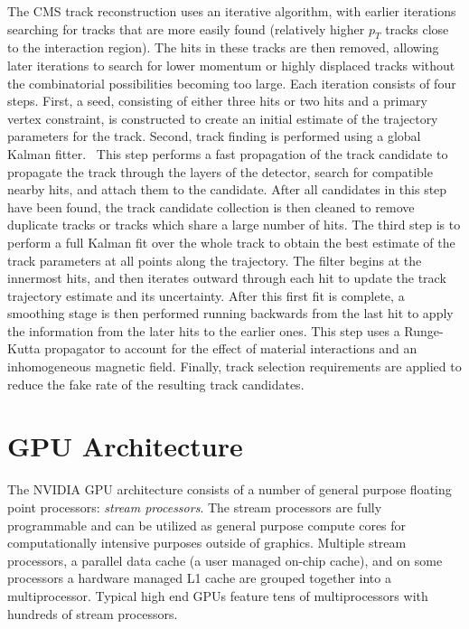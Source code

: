 \documentclass{JINST}
\begin{document}
The CMS track reconstruction uses an iterative algorithm, with earlier iterations searching for tracks that are more easily found 
(relatively higher $p_T$ tracks close to the interaction region). The hits in these tracks are then removed, allowing later iterations 
to search for lower momentum or highly displaced tracks without the combinatorial possibilities becoming too large. Each iteration 
consists of four steps. First, a seed, consisting of either three hits or two hits and a primary vertex constraint, is constructed 
to create an initial estimate of the trajectory parameters for the track. Second, track finding is performed using a global Kalman 
fitter.~\cite{Fruhwirth:1987fm} This step performs a fast propagation of the track candidate to propagate the track through the
 layers of the detector, search for compatible nearby hits, and attach them to the candidate. After all candidates in this step have
 been found, the track candidate collection is then cleaned to remove duplicate tracks or tracks which share a large number of hits. 
The third step is to perform a full Kalman fit over the whole track to obtain the best estimate of the track parameters at all points 
along the trajectory. The filter begins at the innermost hits, and then iterates outward through each hit to update the track trajectory 
estimate and its uncertainty. After this first fit is complete, a smoothing stage is then performed running backwards from the last hit 
to apply the information from the later hits to the earlier ones. This step uses a Runge-Kutta propagator to account for the effect of 
material interactions and an inhomogeneous magnetic field. Finally, track selection requirements are applied to reduce the fake rate of the resulting track candidates.

\section{GPU Architecture}

The NVIDIA GPU architecture consists of a
number of general purpose floating point processors: {\it stream processors}.
The stream processors are fully programmable and can be utilized as general
purpose compute cores for computationally intensive purposes outside of graphics.
Multiple stream processors, a parallel data cache (a user managed
on-chip cache), and on some processors a hardware managed L1 cache are
grouped together into a multiprocessor.  Typical high end GPUs feature tens
of multiprocessors with hundreds of stream processors.
\end{document}
